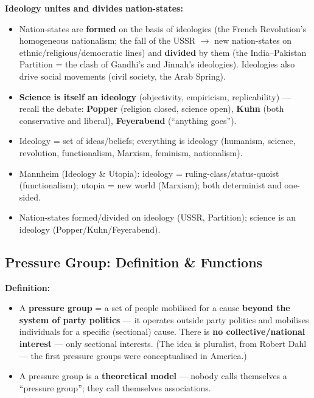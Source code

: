 \begin{CriticalPoint}
\textbf{Ideology unites and divides nation-states:}
\begin{itemize}
\item Nation-states are \textbf{formed} on the basis of ideologies (the French Revolution's homogeneous nationalism; the fall of the USSR $\rightarrow$ new nation-states on ethnic/religious/democratic lines) and \textbf{divided} by them (the India--Pakistan Partition = the clash of Gandhi's and Jinnah's ideologies). Ideologies also drive social movements (civil society, the Arab Spring).
\item \textbf{Science is itself an ideology} (objectivity, empiricism, replicability) --- recall the debate: \textbf{Popper} (religion closed, science open), \textbf{Kuhn} (both conservative and liberal), \textbf{Feyerabend} (``anything goes'').
\end{itemize}
\end{CriticalPoint}

\begin{QuickRevision}
\begin{itemize}
\item Ideology = set of ideas/beliefs; everything is ideology (humanism, science, revolution, functionalism, Marxism, feminism, nationalism).
\item Mannheim (Ideology \& Utopia): ideology = ruling-class/status-quoist (functionalism); utopia = new world (Marxism); both determinist and one-sided.
\item Nation-states formed/divided on ideology (USSR, Partition); science is an ideology (Popper/Kuhn/Feyerabend).
\end{itemize}
\end{QuickRevision}

\sectiondivider

\subsection{Pressure Group: Definition \& Functions}

\begin{KeyConcept}
\textbf{Definition:}
\begin{itemize}
\item A \textbf{pressure group} = a set of people mobilised for a cause \textbf{beyond the system of party politics} --- it operates outside party politics and mobilises individuals for a specific (sectional) cause. There is \textbf{no collective/national interest} --- only sectional interests. (The idea is pluralist, from Robert Dahl --- the first pressure groups were conceptualised in America.)
\item A pressure group is a \textbf{theoretical model} --- nobody calls themselves a ``pressure group''; they call themselves associations.
\end{itemize}
\end{KeyConcept}

